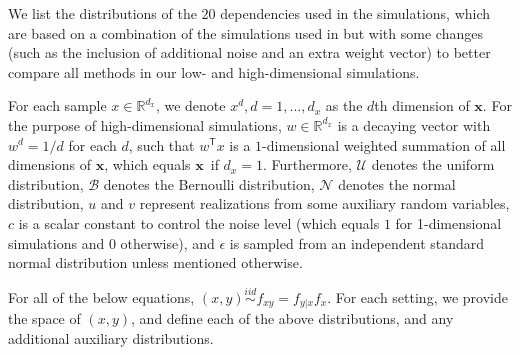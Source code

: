 \documentclass[11pt]{article}
\providecommand{\mb}[1]{\boldsymbol{#1}}
\providecommand{\mc}[1]{\mathcal{#1}}
\newcommand{\Real}{\mathbb{R}}
\newcommand{\T}{^{\ensuremath{\mathsf{T}}}}           %
\newcommand{\mbx}{\ensuremath{\mb{x}}}
\begin{document}
We list the distributions of the $20$ dependencies used in the simulations, which are based on a combination of the simulations used in \cite{SzekelyRizzoBakirov2007, SimonTibshirani2012, SimonTibshirani2012, GorfineHellerHeller2012} but with some changes (such as the inclusion of additional noise and an extra weight vector) to better compare all methods in our low- and high-dimensional simulations.

For each sample $x \in \Real^{d_{x}}$, we denote $x^{d}, d=1,\ldots,d_{x}$ as the $d$th dimension of \mbx. For the purpose of high-dimensional simulations, $w \in \Real^{d_{x}}$ is a decaying vector with $w^{d}=1/d$ for each $d$, such that $w\T x$ is a $1$-dimensional weighted summation of all dimensions of \mbx, which equals \mbx~if $d_{x}=1$. Furthermore, $\mc{U}$ denotes the uniform distribution, $\mc{B}$ denotes the Bernoulli distribution, $\mc{N}$ denotes the normal distribution, $u$ and $v$ represent realizations from some auxiliary random variables, $c$ is a scalar constant to control the noise level (which equals $1$ for 1-dimensional simulations and $0$ otherwise), and $\epsilon$ is sampled from an independent standard normal distribution unless mentioned otherwise. 

For all of the below equations, $(x,y) \overset{iid}{\sim} f_{xy} = f_{y|x} f_x$. For each setting, we provide the space of $(x,y)$, and define each of the above distributions, and any additional auxiliary distributions.
\end{document}
